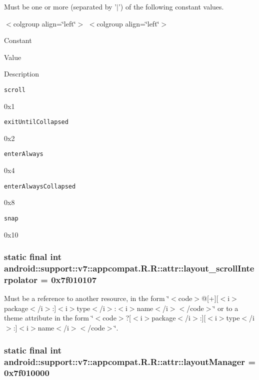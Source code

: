 Must be one or more (separated by '$|$') of the following constant values. \begin{TabularC}{0}
\hline
\end{TabularC}
$<$colgroup align=\char`\"{}left\char`\"{}$>$ $<$colgroup align=\char`\"{}left\char`\"{}$>$ 

Constant

Value

Description 

{\tt scroll}

0x1

{\tt exitUntilCollapsed}

0x2

{\tt enterAlways}

0x4

{\tt enterAlwaysCollapsed}

0x8

{\tt snap}

0x10\hypertarget{classandroid_1_1support_1_1v7_1_1appcompat_1_1_r_1_1attr_742dbff330d88516a9d1593210315a63}{
\subsubsection[{layout\_\-scrollInterpolator}]{\setlength{\rightskip}{0pt plus 5cm}static final int android::support::v7::appcompat.R.R::attr::layout\_\-scrollInterpolator = 0x7f010107}}
\label{classandroid_1_1support_1_1v7_1_1appcompat_1_1_r_1_1attr_742dbff330d88516a9d1593210315a63}


Must be a reference to another resource, in the form \char`\"{}$<$code$>$@\mbox{[}+\mbox{]}\mbox{[}$<$i$>$package$<$/i$>$:\mbox{]}$<$i$>$type$<$/i$>$:$<$i$>$name$<$/i$>$$<$/code$>$\char`\"{} or to a theme attribute in the form \char`\"{}$<$code$>$?\mbox{[}$<$i$>$package$<$/i$>$:\mbox{]}\mbox{[}$<$i$>$type$<$/i$>$:\mbox{]}$<$i$>$name$<$/i$>$$<$/code$>$\char`\"{}. \hypertarget{classandroid_1_1support_1_1v7_1_1appcompat_1_1_r_1_1attr_fb3c774917c8d1d641730fc94fa11edf}{
\subsubsection[{layoutManager}]{\setlength{\rightskip}{0pt plus 5cm}static final int android::support::v7::appcompat.R.R::attr::layoutManager = 0x7f010000}}
\label{classandroid_1_1support_1_1v7_1_1appcompat_1_1_r_1_1attr_fb3c774917c8d1d641730fc94fa11edf}


